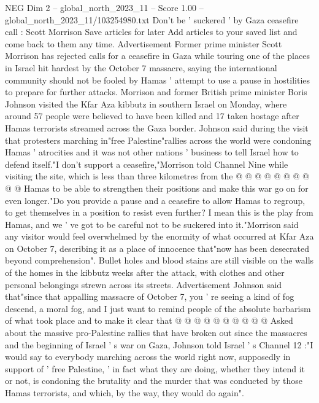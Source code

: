\begin{textsample}{NEG Dim 2 – global\_north\_2023\_11 – Score 1.00 – global\_north\_2023\_11/103254980.txt}  \label{ex:f2_neg_213}
Don't be ' suckered ' by Gaza ceasefire call : Scott Morrison Save articles for later Add articles to your saved list and come back to them any time.
Advertisement Former prime minister Scott Morrison has rejected calls for a ceasefire in Gaza while touring one of the places in Israel hit hardest by the October 7 massacre, saying the international community should not be fooled by Hamas ' attempt to use a pause in hostilities to prepare for further attacks.
Morrison and former British prime minister Boris Johnson visited the Kfar Aza kibbutz in southern Israel on Monday, where around 57 people were believed to have been killed and 17 taken hostage after Hamas terrorists streamed across the Gaza border.
Johnson said during the visit that protesters marching in"free Palestine"rallies across the world were condoning Hamas ' atrocities and it was not other nations ' business to tell Israel how to defend itself."I don't support a ceasefire,"Morrison told Channel Nine while visiting the site, which is less than three kilometres from the @ @ @ @ @ @ @ @ @ @ Hamas to be able to strengthen their positions and make this war go on for even longer."Do you provide a pause and a ceasefire to allow Hamas to regroup, to get themselves in a position to resist even further?
I mean this is the play from Hamas, and we ' ve got to be careful not to be suckered into it."Morrison said any visitor would feel overwhelmed by the enormity of what occurred at Kfar Aza on October 7, describing it as a place of innocence that"now has been desecrated beyond comprehension".
Bullet holes and blood stains are still visible on the walls of the homes in the kibbutz weeks after the attack, with clothes and other personal belongings strewn across its streets.
Advertisement Johnson said that"since that appalling massacre of October 7, you ' re seeing a kind of fog descend, a moral fog, and I just want to remind people of the absolute barbarism of what took place and to make it clear that @ @ @ @ @ @ @ @ @ @ Asked about the massive pro-Palestine rallies that have broken out since the massacres and the beginning of Israel ' s war on Gaza, Johnson told Israel ' s Channel 12 :"I would say to everybody marching across the world right now, supposedly in support of ' free Palestine, ' in fact what they are doing, whether they intend it or not, is condoning the brutality and the murder that was conducted by those Hamas terrorists, and which, by the way, they would do again".

\end{textsample}
